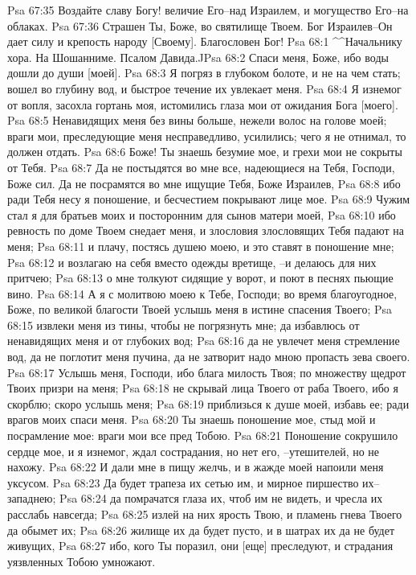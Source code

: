 Psa 67:35  Воздайте славу Богу! величие Его--над Израилем, и могущество Его--на облаках.
Psa 67:36  Страшен Ты, Боже, во святилище Твоем. Бог Израилев--Он дает силу и крепость народу [Своему]. Благословен Бог!
Psa 68:1  ^^Начальнику хора. На Шошанниме. Псалом Давида.^^
Psa 68:2  Спаси меня, Боже, ибо воды дошли до души [моей].
Psa 68:3  Я погряз в глубоком болоте, и не на чем стать; вошел во глубину вод, и быстрое течение их увлекает меня.
Psa 68:4  Я изнемог от вопля, засохла гортань моя, истомились глаза мои от ожидания Бога [моего].
Psa 68:5  Ненавидящих меня без вины больше, нежели волос на голове моей; враги мои, преследующие меня несправедливо, усилились; чего я не отнимал, то должен отдать.
Psa 68:6  Боже! Ты знаешь безумие мое, и грехи мои не сокрыты от Тебя.
Psa 68:7  Да не постыдятся во мне все, надеющиеся на Тебя, Господи, Боже сил. Да не посрамятся во мне ищущие Тебя, Боже Израилев,
Psa 68:8  ибо ради Тебя несу я поношение, и бесчестием покрывают лице мое.
Psa 68:9  Чужим стал я для братьев моих и посторонним для сынов матери моей,
Psa 68:10  ибо ревность по доме Твоем снедает меня, и злословия злословящих Тебя падают на меня;
Psa 68:11  и плачу, постясь душею моею, и это ставят в поношение мне;
Psa 68:12  и возлагаю на себя вместо одежды вретище, --и делаюсь для них притчею;
Psa 68:13  о мне толкуют сидящие у ворот, и поют в песнях пьющие вино.
Psa 68:14  А я с молитвою моею к Тебе, Господи; во время благоугодное, Боже, по великой благости Твоей услышь меня в истине спасения Твоего;
Psa 68:15  извлеки меня из тины, чтобы не погрязнуть мне; да избавлюсь от ненавидящих меня и от глубоких вод;
Psa 68:16  да не увлечет меня стремление вод, да не поглотит меня пучина, да не затворит надо мною пропасть зева своего.
Psa 68:17  Услышь меня, Господи, ибо блага милость Твоя; по множеству щедрот Твоих призри на меня;
Psa 68:18  не скрывай лица Твоего от раба Твоего, ибо я скорблю; скоро услышь меня;
Psa 68:19  приблизься к душе моей, избавь ее; ради врагов моих спаси меня.
Psa 68:20  Ты знаешь поношение мое, стыд мой и посрамление мое: враги мои все пред Тобою.
Psa 68:21  Поношение сокрушило сердце мое, и я изнемог, ждал сострадания, но нет его, --утешителей, но не нахожу.
Psa 68:22  И дали мне в пищу желчь, и в жажде моей напоили меня уксусом.
Psa 68:23  Да будет трапеза их сетью им, и мирное пиршество их--западнею;
Psa 68:24  да помрачатся глаза их, чтоб им не видеть, и чресла их расслабь навсегда;
Psa 68:25  излей на них ярость Твою, и пламень гнева Твоего да обымет их;
Psa 68:26  жилище их да будет пусто, и в шатрах их да не будет живущих,
Psa 68:27  ибо, кого Ты поразил, они [еще] преследуют, и страдания уязвленных Тобою умножают.

